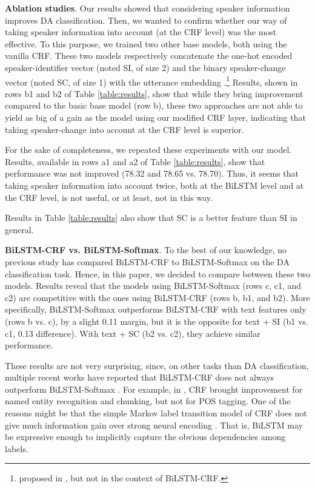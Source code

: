\documentclass[11pt,a4paper]{article}
\begin{document}
\noindent \textbf{Ablation studies}.
Our results showed that considering speaker information improves DA classification.
Then, we wanted to confirm whether our way of taking speaker information into account (at the CRF level) was the most effective.
To this purpose, we trained two other base models, both using the vanilla CRF.
These two models respectively concatenate the one-hot encoded speaker-identifier vector (noted SI, of size 2) and the binary speaker-change vector (noted SC, of size 1) with the utterance embedding .\footnote{proposed in \citep{liu-etal-2017-using-context,bothe-etal-2018-context}, but not in the context of BiLSTM-CRF.}
Results, shown in rows b1 and b2 of Table \ref{table:results}, show that while they bring improvement compared to the basic base model (row b), these two approaches are not able to yield as big of a gain as the model using our modified CRF layer, indicating that taking speaker-change into account at the CRF level is superior.

For the sake of completeness, we repeated these experiments with our model.
Results, available in rows a1 and a2 of Table \ref{table:results}, show that performance was not improved (78.32 and 78.65 vs. 78.70).
Thus, it seems that taking speaker information into account twice, both at the BiLSTM level and at the CRF level, is not useful, or at least, not in this way.

Results in Table \ref{table:results} also show that SC is a better feature than SI in general.

\noindent \textbf{BiLSTM-CRF vs. BiLSTM-Softmax}.
To the best of our knowledge, no previous study has compared BiLSTM-CRF to BiLSTM-Softmax on the DA classification task.
Hence, in this paper, we decided to compare between these two models.
Results reveal that the models using BiLSTM-Softmax (rows c, c1, and c2) are competitive with the ones using BiLSTM-CRF (rows b, b1, and b2).
More specifically, BiLSTM-Softmax outperforms BiLSTM-CRF with text features only (rows b vs. c), by a slight 0.11 margin, but it is the opposite for text + SI (b1 vs. c1, 0.13 difference).
With text + SC (b2 vs. c2), they achieve similar performance.

These results are not very surprising, since, on other tasks than DA classification,  multiple recent works have reported that BiLSTM-CRF does not always outperform  BiLSTM-Softmax \citep{reimers2017optimal,yang2018design,cui2019hierarchically}.
For example, in \cite{yang2018design}, CRF brought improvement for named entity recognition and chunking, but not for POS tagging. 
One of the reasons might be that the simple Markov label transition model of CRF does not give much information gain over strong neural encoding \citep{cui2019hierarchically}.
That is, BiLSTM may be expressive enough to implicitly capture the obvious dependencies among labels.
\end{document}
